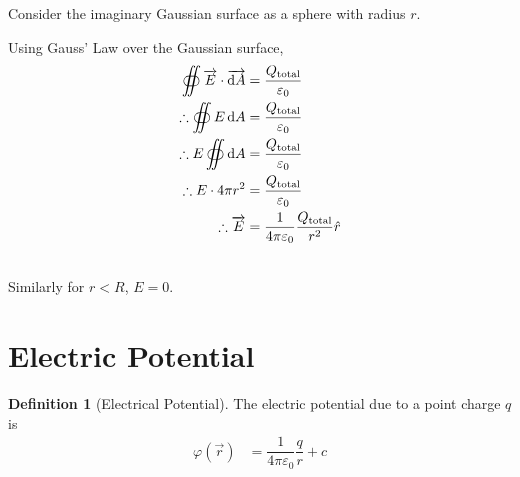 \documentclass[fleqn, a4paper, 12pt, twoside]{article}
\theoremstyle{definition}
\newtheorem{definition}{Definition}
\theoremstyle{theorem}
\begin{document}
\begin{solution}
	Consider the imaginary Gaussian surface as a sphere with radius $r$.
	\begin{figure}[H]
	\end{figure}
	Using Gauss' Law over the Gaussian surface,
	\begin{align*}
		\oiint \overrightarrow{E} \cdot \overrightarrow{\dif A} &= \dfrac{Q_{\textnormal{total}}}{\varepsilon_0}\\
		\therefore \oiint E \dif A &= \dfrac{Q_{\textnormal{total}}}{\varepsilon_0}\\
		\therefore E \oiint \dif A &= \dfrac{Q_{\textnormal{total}}}{\varepsilon_0}\\
		\therefore E \cdot 4 \pi r^2 &= \dfrac{Q_{\textnormal{total}}}{\varepsilon_0}\\
		\therefore \overrightarrow{E} &= \dfrac{1}{4 \pi \varepsilon_0} \dfrac{Q_{\textnormal{total}}}{r^2} \hat{r}
	\end{align*}
\end{solution}
~\\
Similarly for $r < R$, $E = 0$.

\section{Electric Potential}

\begin{definition}[Electrical Potential]
	The electric potential due to a point charge $q$ is
	\begin{align*}
		\varphi \left( \overrightarrow{r} \right) &= \dfrac{1}{4 \pi \varepsilon_0} \dfrac{q}{r} + c
	\end{align*}
\end{definition}
\end{document}
